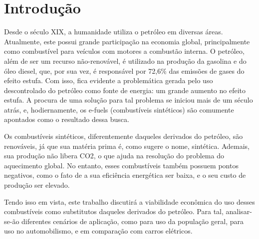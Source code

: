 
\chapter{Introdução}
\label{cap:cap01}

Desde o século XIX, a humanidade utiliza o petróleo em diversas áreas. 
Atualmente, este possui grande participação na economia global, 
principalmente como combustível para veículos com motores a combustão interna. 
O petróleo, além de ser um recurso não-renovável, é utilizado na produção da gasolina e do óleo diesel, que, por sua vez, 
é responsável por 72,6\% das emissões de gases do efeito estufa. 
Com isso, fica evidente a problemática gerada pelo uso descontrolado do petróleo como fonte de energia: 
um grande aumento no efeito estufa. A procura de uma solução para tal problema se iniciou mais de um século atrás, e, 
hodiernamente, os e-fuels (combustíveis sintéticos) são comumente apontados como o resultado dessa busca.

Os combustíveis sintéticos, diferentemente daqueles derivados do petróleo, são renováveis, já que sua matéria prima é, como sugere o nome, sintética. Ademais, sua produção não libera CO2, o que ajuda na resolução do problema do aquecimento global. No entanto, esses combustíveis também possuem pontos negativos, como o fato de a sua eficiência energética ser baixa, e o seu custo de produção ser elevado.

Tendo isso em vista, este trabalho discutirá a viabilidade econômica do uso desses combustíveis como substitutos daqueles derivados do petróleo. Para tal, analisar-se-ão diferentes cenários de aplicação, como para uso da população geral, para uso no automobilismo, e em comparação com carros elétricos.